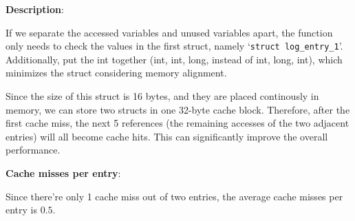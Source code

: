\begin{questions}
{\begin{solution}
\begin{verbatim}
        \end{verbatim}

        \textbf{Description}:

        If we separate the accessed variables and unused variables apart, the function only needs to check the values in the first struct, namely `\texttt{struct log\_entry\_1}'. Additionally, put the int together (int, int, long, instead of int, long, int), which minimizes the struct considering memory alignment.

        Since the size of this struct is 16 bytes, and they are placed continously in memory, we can store two structs in one 32-byte cache block. Therefore, after the first cache miss, the next 5 references (the remaining accesses of the two adjacent entries) will all become cache hits. This can significantly improve the overall performance.\newline

        \textbf{Cache misses per entry}:

        Since there're only 1 cache miss out of two entries, the average cache misses per entry is $0.5$.



        \vspace{4in}
    \end{solution}
}

\end{questions}